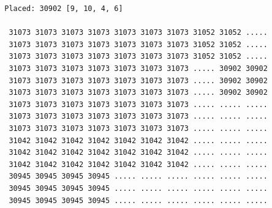 \documentclass[a4paper,12pt]{report}
\begin{document}
\begin{listing}
	\begin{verbatim}
		Placed: 30902 [9, 10, 4, 6]

		 31073 31073 31073 31073 31073 31073 31073 31052 31052 .....
		 31073 31073 31073 31073 31073 31073 31073 31052 31052 .....
		 31073 31073 31073 31073 31073 31073 31073 31052 31052 .....
		 31073 31073 31073 31073 31073 31073 31073 ..... 30902 30902
		 31073 31073 31073 31073 31073 31073 31073 ..... 30902 30902
		 31073 31073 31073 31073 31073 31073 31073 ..... 30902 30902
		 31073 31073 31073 31073 31073 31073 31073 ..... ..... .....
		 31073 31073 31073 31073 31073 31073 31073 ..... ..... .....
		 31073 31073 31073 31073 31073 31073 31073 ..... ..... .....
		 31042 31042 31042 31042 31042 31042 31042 ..... ..... .....
		 31042 31042 31042 31042 31042 31042 31042 ..... ..... .....
		 31042 31042 31042 31042 31042 31042 31042 ..... ..... .....
		 30945 30945 30945 30945 ..... ..... ..... ..... ..... .....
		 30945 30945 30945 30945 ..... ..... ..... ..... ..... .....
		 30945 30945 30945 30945 ..... ..... ..... ..... ..... .....
	\end{verbatim}
  \caption{Algoritme 1: Layout van de volgende oplossing (bemerk verplaatst artikel 30902)}
  \label{listing:volgendeopl}
\end{listing}
\end{document}
